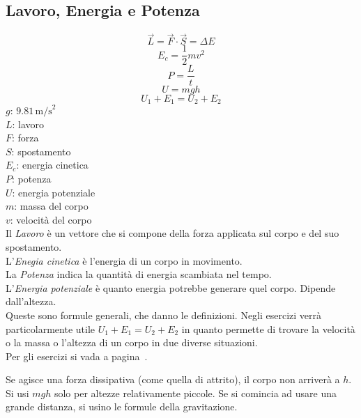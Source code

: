 \subsection{Lavoro, Energia e Potenza}\label{subsec:dinamica:potenziale}
\begin{equation*}
\vec{L} = \vec{F} \cdot \vec{S} = \Delta E
\end{equation*}
\begin{equation*}
E_c = \frac{1}{2}mv^2
\end{equation*}
\begin{equation*}
P = \frac{L}{t}
\end{equation*}
\begin{equation*}
U = mgh
\end{equation*}
\begin{equation*}
U_1 + E_1 = U_2 + E_2
\end{equation*}
\hyperref[tab:g]{$g$}: $9.81\,\text{m/s}^2$\\
$L$: lavoro\\
$F$: forza\\
$S$: spostamento\\
$E_c$: energia cinetica\\
$P$: potenza\\
$U$: energia potenziale\\
$m$: massa del corpo\\
$v$: velocità del corpo\\[\baselineskip]
Il \emph{Lavoro} è un vettore che si compone della forza applicata sul corpo e del suo spostamento.\\
L'\emph{Enegia cinetica} è l'energia di un corpo in movimento.\\
La \emph{Potenza} indica la quantità di energia scambiata nel tempo.\\
L'\emph{Energia potenziale} è quanto energia potrebbe generare quel corpo. Dipende dall'altezza.\\

Queste sono formule generali, che danno le definizioni. Negli esercizi verrà particolarmente utile
$U_1 + E_1 = U_2 + E_2$ in quanto permette di trovare la velocità o la massa o l'altezza di un corpo
in due diverse situazioni.\\
Per gli esercizi si vada a pagina~\pageref{ex:potenziale}.\\[\baselineskip]

\begin{center}
\end{center}
Se agisce una forza dissipativa (come quella di attrito), il corpo non arriverà a $h$.\\
Si usi $mgh$ solo per altezze relativamente piccole. Se si comincia ad usare una grande distanza, si
usino le formule della gravitazione.

